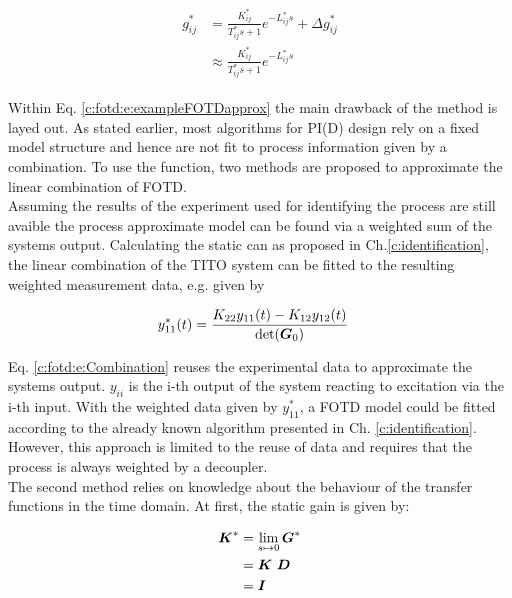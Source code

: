 \begin{align}
\begin{split}
g_{ij}^* & = \frac{K_{ij}^*}{T_{ij}^*s+1}e^{-L_{ij}^* s} + \Delta g_{ij}^*\\
&\approx \frac{K_{ij}^*}{T_{ij}^*s+1}e^{-L_{ij}^* s} 
\end{split}
\label{c:fotd:e:exampleFOTDapprox}
\end{align}

Within Eq. \ref{c:fotd:e:exampleFOTDapprox} the main drawback of the method is layed out. As stated earlier, most algorithms for PI(D) design rely on a fixed model structure and hence are not fit to process information given by a combination. To use the function, two methods are proposed to approximate the linear combination of FOTD.\\

Assuming the results of the experiment used for identifying the process are still avaible the process approximate model can be found via a weighted sum of the systems output. Calculating the static can as proposed in Ch.\ref{c:identification}, the linear combination of the TITO system can be fitted to the resulting weighted measurement data, e.g. given by

\begin{align}
\begin{split}
y_{11}^*(t) &= \frac{K_{22} y_{11}(t) - K_{12} y_{12}(t)}{\det(\mbox{\boldmath$G$}_0)}
\end{split}
\label{c:fotd:e:Combination}
\end{align}

Eq. \ref{c:fotd:e:Combination} reuses the experimental data to approximate the systems output. $y_{ii}$ is the i-th output of the system reacting to excitation via the i-th input. With the weighted data given by $y_{11}^*$, a FOTD model could be fitted according to the already known algorithm presented in Ch. \ref{c:identification}. However, this approach is limited to the reuse of data and requires that the process is always weighted by a decoupler.\\

The second method relies on knowledge about the behaviour of the transfer functions in the time domain. At first, the static gain is given by:

\begin{align}
\begin{split}
\mbox{\boldmath$K$}^* &= \lim_{s\mapsto 0} \mbox{\boldmath$G$}^* \\
&= \mbox{\boldmath$K$} ~\mbox{\boldmath$D$} \\
&= \mbox{\boldmath$I$}
\end{split}
\label{c:fotd:e:CombinationGain}
\end{align}

